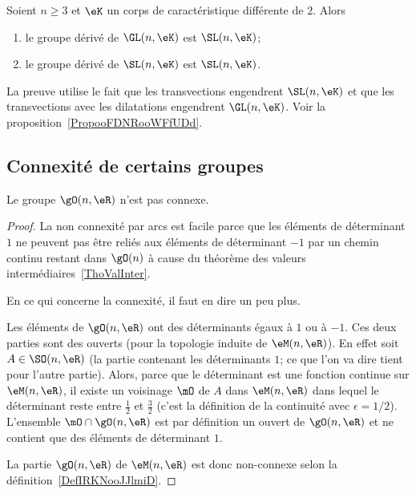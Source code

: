 \begin{proposition}      \label{PROPooSAOTooIlpJoY}
	Soient \( n\geq 3\) et \( \eK\) un corps de caractéristique différente de \( 2\). Alors
	\begin{enumerate}
		\item
		      le groupe dérivé de \( \GL(n,\eK)\) est \( \SL(n,\eK)\);  
		\item
		      le groupe dérivé de \( \SL(n,\eK)\) est \( \SL(n,\eK)\).  
	\end{enumerate}
\end{proposition}
La preuve utilise le fait que les transvections engendrent \( \SL(n,\eK)\) et que les transvections avec les dilatations engendrent \( \GL(n,\eK)\). Voir la proposition~\ref{PropooFDNRooWFfUDd}.

\subsection{Connexité  de certains groupes}

\begin{lemma}           \label{LEMooIPOVooZJyNoH}
	Le groupe \( \gO(n,\eR)\) n'est pas connexe.
\end{lemma}

\begin{proof}
	La non connexité par arcs est facile parce que les éléments de déterminant \( 1\) ne peuvent pas être reliés aux éléments de déterminant \( -1\) par un chemin continu restant dans \( \gO(n)\) à cause du théorème des valeurs intermédiaires~\ref{ThoValInter}.

	En ce qui concerne la connexité, il faut en dire un peu plus.

	Les éléments de \( \gO(n,\eR)\) ont des déterminants égaux à \( 1\) ou à \( -1\). Ces deux parties sont des ouverts (pour la topologie induite de \( \eM(n,\eR)\)). En effet soit \( A\in\SO(n,\eR)\) (la partie contenant les déterminants \( 1\); ce que l'on va dire tient pour l'autre partie). Alors, parce que le déterminant est une fonction continue sur \( \eM(n,\eR)\), il existe un voisinage \( \mO\) de \( A\) dans \( \eM(n,\eR)\) dans lequel le déterminant reste entre \( \frac{ 1 }{2}\) et \( \frac{ 3 }{2}\) (c'est la définition de la continuité avec \( \epsilon=1/2\)). L'ensemble \( \mO\cap\gO(n,\eR)\) est par définition un ouvert de \( \gO(n,\eR)\) et ne contient que des éléments de déterminant \( 1\).

	La partie \( \gO(n,\eR)\) de \( \eM(n,\eR)\) est donc non-connexe selon la définition~\ref{DefIRKNooJJlmiD}.
\end{proof}

